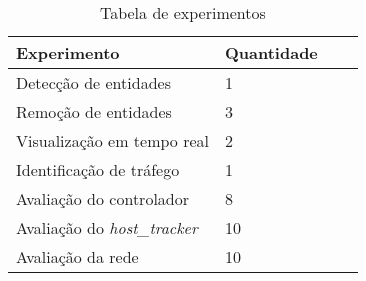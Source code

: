 
\begin{table}[h!]
    \centering
    \begin{tabular}{ | l | l | l | l |}
    \hline
    \textbf{Experimento} & \textbf{Quantidade} \\ 
    \hline
    \hline Detecção de entidades & 1 \\ 
    \hline Remoção de entidades & 3 \\ 
    \hline Visualização em tempo real& 2 \\ 
    \hline Identificação de tráfego & 1 \\
    \hline Avaliação do controlador  & 8 \\
    \hline Avaliação do \emph{host\_tracker} & 10 \\
    \hline Avaliação da rede & 10 \\
    \hline
    \end{tabular}
    \caption{Tabela de experimentos}
    \label{tbl:experiments}
\end{table}
